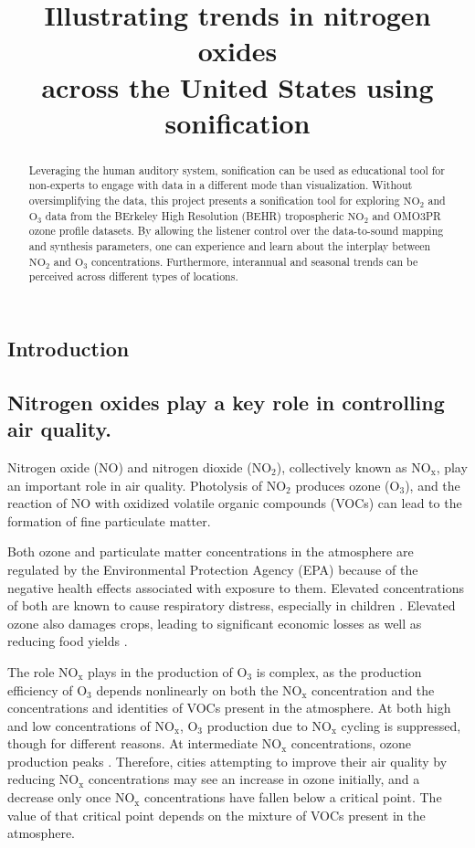 \documentclass[a4paper,10pt,oneside]{article}
\title{Illustrating trends in nitrogen oxides \\across the United States using sonification}
\newcommand{\ce}[1]{$\mathrm{#1}$}
\begin{document}
\ninept
\maketitle

\begin{sloppy}

\begin{abstract}
    Leveraging the human auditory system, sonification can be used as educational tool for non-experts to engage with data in a different mode than visualization.  Without oversimplifying the data, this project presents a sonification tool for exploring \ce{NO_2} and \ce{O_3} data from the BErkeley High Resolution (BEHR) tropospheric \ce{NO_2} and OMO3PR ozone profile datasets.  By allowing the listener control over the data-to-sound mapping and synthesis parameters, one can experience and learn about the interplay between \ce{NO_2} and \ce{O_3} concentrations.  Furthermore, interannual and seasonal trends can be perceived across different types of locations. 
\end{abstract}

\section{Introduction}
\label{sec:intro}

\subsection{Nitrogen oxides play a key role in controlling air quality.}
\label{sec:nox-chemistry}
Nitrogen oxide (\ce{NO}) and nitrogen dioxide (\ce{NO_2}), collectively known as \ce{NO_x}, play an important role in air quality.  Photolysis of \ce{NO_2} produces ozone (\ce{O_3}), and the reaction of \ce{NO} with oxidized volatile organic compounds (VOCs) can lead to the formation of fine particulate matter.

Both ozone and particulate matter concentrations in the atmosphere are regulated by the Environmental Protection Agency (EPA) because of the negative health effects associated with exposure to them. Elevated concentrations of both are known to cause respiratory distress, especially in children \cite{romieu96}. Elevated ozone also damages crops, leading to significant economic losses as well as reducing food yields \cite{tai14}.

The role \ce{NO_x} plays in the production of \ce{O_3} is complex, as the production efficiency of \ce{O_3} depends nonlinearly on both the \ce{NO_x} concentration and the concentrations and identities of VOCs present in the atmosphere. At both high and low concentrations of \ce{NO_x}, \ce{O_3} production due to \ce{NO_x} cycling is suppressed, though for different reasons. At intermediate \ce{NO_x} concentrations, ozone production peaks \cite{murphy07}.  Therefore, cities attempting to improve their air quality by reducing \ce{NO_x} concentrations may see an increase in ozone initially, and a decrease only once \ce{NO_x} concentrations have fallen below a critical point. The value of that critical point depends on the mixture of VOCs present in the atmosphere.


\end{sloppy}
\end{document}
